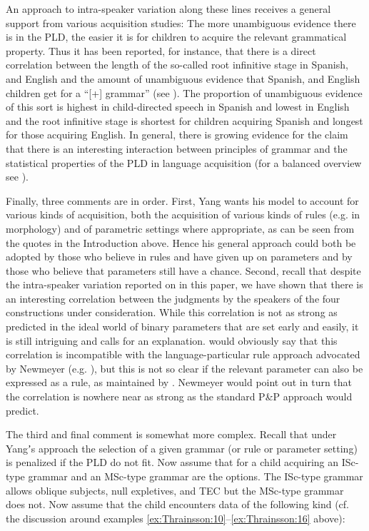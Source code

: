 \documentclass[output=paper]{LSP/langsci}
\begin{document}
An approach to intra-speaker variation along these lines receives a general support from various acquisition studies: The more unambiguous evidence there is in the PLD, the easier it is for children to acquire the relevant grammatical property. Thus it has been reported, for instance, that there is a direct correlation between the length of the so-called root infinitive stage in Spanish,  and English and the amount of unambiguous evidence that Spanish,  and English children get for a “[+] grammar” (see \citealt{LegateEtAl2007}). The proportion of unambiguous evidence of this sort is highest in child-directed speech in Spanish and lowest in English and the root infinitive stage is shortest for children acquiring Spanish and longest for those acquiring English. In general, there is growing evidence for the claim that there is an interesting interaction between  principles of grammar and the statistical properties of the PLD in language acquisition (for a balanced overview see \citealt{Lidz2015}).

Finally, three comments are in order. First, Yang wants his model to account for various kinds of acquisition, both the acquisition of various kinds of rules (e.g. in morphology) and of parametric settings where appropriate, as can be seen from the quotes in the Introduction above. Hence his general approach could both be adopted by those who believe in rules and have given up on parameters and by those who believe that parameters still have a chance. Second, recall that despite the intra-speaker variation reported on in this paper, we have shown that there is an interesting correlation between the judgments by the speakers of the four constructions under consideration. While this correlation is not as strong as predicted in the ideal world of binary parameters that are set early and easily, it is still intriguing and calls for an explanation. \citet{Roberts2005} would obviously say that this correlation is incompatible with the language-particular rule approach advocated by Newmeyer (e.g. \citeyear{Newmeyer2004}), but this is not so clear if the relevant parameter can also be expressed as a rule, as maintained by \citet[7]{Newmeyer2006}. Newmeyer would point out in turn that the correlation is nowhere near as strong as the standard P{\&}P approach would predict.

\newpage 
The third and final comment is somewhat more complex. Recall that under Yangʼs approach the selection of a given grammar (or rule or parameter setting) is penalized if the PLD do not fit. Now assume that for a child acquiring  an ISc-type grammar and an MSc-type grammar are the options. The ISc-type grammar allows oblique subjects, null expletives,  and TEC but the MSc-type grammar does not. Now assume that the child encounters data of the following kind (cf. the discussion around examples \ref{ex:Thrainsson:10}--\ref{ex:Thrainsson:16} above):
\end{document}
